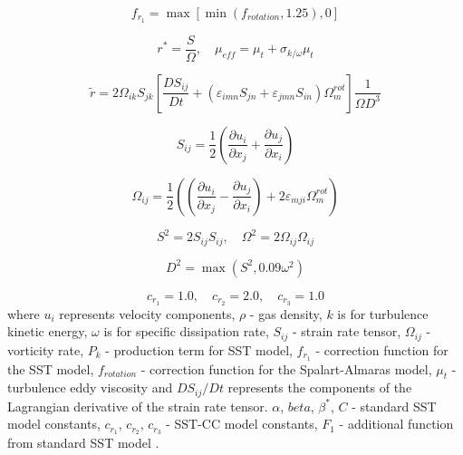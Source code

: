 \documentclass[a4paper]{jpconf}
\begin{document}
\begin{figure}[h]
\begin{minipage}{20pc}
\begin{equation}
f_{r_1} = \max\left[ \min(f_{rotation}, 1.25), 0 \right]
\end{equation}

\begin{equation}
r^*=\frac{S}{\Omega}, \quad \mu_{eff}=\mu_t + \sigma_{k/\omega}\mu_t
\end{equation}

\end{minipage}
\end{figure}
\begin{equation}
\tilde{r} = 2\Omega_{ik}S_{jk}\left[ \frac{DS_{ij}}{Dt} + \left( \varepsilon_{imn}S_{jn} + \varepsilon_{jmn}S_{in} \right)\Omega^{rot}_m \right]\frac{1}{\Omega D^3}
\end{equation}

 \begin{equation}
 S_{ij} = \frac{1}{2}\left( \frac{\partial u_i}{\partial x_j} + \frac{\partial u_j}{\partial x_i} \right)
 \end{equation}

\begin{equation}
\Omega_{ij} = \frac{1}{2}\left( \left( \frac{\partial u_i}{\partial x_j} - \frac{\partial u_j}{\partial x_i}  \right) +2\varepsilon_{mji} \Omega^{rot}_m \right)
\end{equation}

\begin{equation}
S^2 = 2S_{ij}S_{ij}, \quad 
\Omega^2 = 2\Omega_{ij}\Omega_{ij}
\end{equation}

\begin{equation}
D^2 = \max(S^2, 0.09\omega^2)
\end{equation}

$$
c_{r_1} = 1.0, \quad c_{r_2} = 2.0, \quad c_{r_3} = 1.0
$$
 where $u_i$ represents velocity components, $\rho$ - gas density, $k$ is for turbulence kinetic energy, $\omega$ is for specific dissipation rate, $S_{ij}$ - strain rate tensor, $\Omega_{ij}$ - vorticity rate, $P_k$ - production term for SST model, $f_{r_1}$ - correction function for the SST model, $f_{rotation}$ - correction function for the Spalart-Almaras model, $\mu_{t}$ - turbulence eddy viscosity and $DS_{ij}/Dt$ represents the components of the Lagrangian derivative of the strain rate tensor. $\alpha$, $beta$, $\beta^*$, $C$ - standard SST model constants, $c_{r_1}$, $c_{r_2}$, $c_{r_3}$ - SST-CC model constants, $F_1$ - additional function from standard SST model \cite{Menter}.
\end{document}
